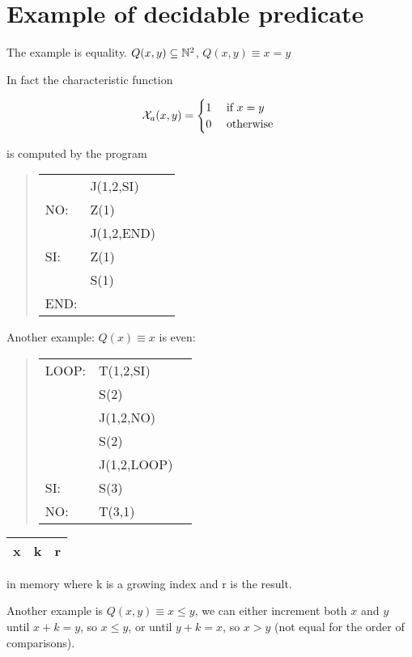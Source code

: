 \section {Example of decidable predicate}

The example is equality. $ Q(x,y) \subseteq \mathbb{N}^2 $, $ Q(x,y) \equiv x = y $

In fact the characteristic function

\begin{equation*}
\mathcal{X}_a(x,y) = \begin{cases}
1 & $ if $ x = y  \\
0 & $ otherwise $
\end{cases}
\end{equation*}

is computed by the program

\begin{quote}
\begin{tabular}{lll}            
& J(1,2,SI)  \\
NO:  & Z(1)       \\
& J(1,2,END) \\
SI:  & Z(1)       \\
& S(1)       \\
END: &
\end{tabular}
\end{quote}

Another example: $ Q(x) \equiv x $ is even:

\begin{quote}
\begin{tabular}{lll}            
LOOP: & T(1,2,SI)   \\
& S(2)        \\
& J(1,2,NO)   \\
& S(2)        \\
& J(1,2,LOOP) \\
SI:   & S(3)        \\
NO:   & T(3,1)
\end{tabular}
\end{quote}

\begin{tabu}{|c|c|c|}
\hline
x & k & r \\
\hline
\end{tabu} in memory where k is a growing index and r is the result.

Another example is $Q(x,y) \equiv x \leq y$, we can either increment both $x$ and $y$ until $x+k=y$, so $x\leq y$, or until $y+k=x$, so $x>y$ (not equal for the order of comparisons).

